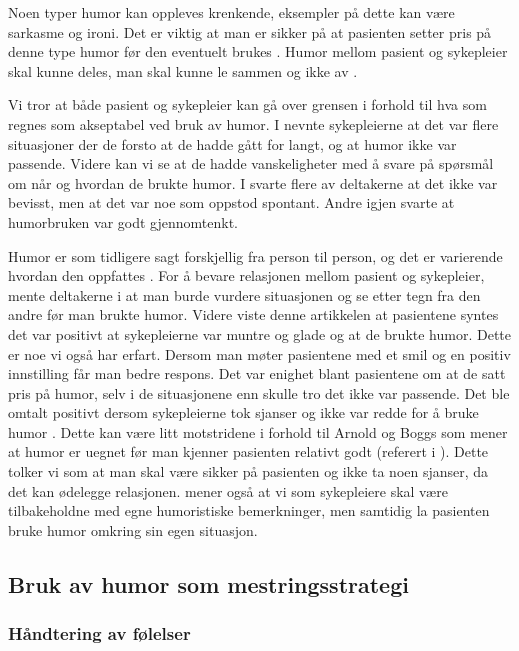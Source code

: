 Noen typer humor kan oppleves krenkende, eksempler på dette kan være sarkasme
og ironi. Det er viktig at man er sikker på at pasienten setter pris på denne
type humor før den eventuelt brukes \cite{eide2008}. Humor mellom pasient og
sykepleier skal kunne deles, man skal kunne le sammen og ikke av
\cite{wist2002}.

Vi tror at både pasient og sykepleier kan gå over grensen i forhold til hva som
regnes som akseptabel ved bruk av humor. I  nevnte sykepleierne
at det var flere situasjoner der de forsto at de hadde gått for langt, og at
humor ikke var passende. Videre kan vi se at de hadde vanskeligheter med å
svare på spørsmål om når og hvordan de brukte humor. I  svarte
flere av deltakerne at det ikke var bevisst, men at det var noe som oppstod
spontant. Andre igjen svarte at humorbruken var godt gjennomtenkt.

Humor er som tidligere sagt forskjellig fra person til person, og det er
varierende hvordan den oppfattes \cite{bjork2011}. For å bevare relasjonen
mellom pasient og sykepleier, mente deltakerne i  at man
burde vurdere situasjonen og se etter tegn fra den andre før man brukte humor.
Videre viste denne artikkelen at pasientene syntes det var positivt at
sykepleierne var muntre og glade og at de brukte humor. Dette er noe vi også
har erfart. Dersom man møter pasientene med et smil og en positiv innstilling
får man bedre respons. Det var enighet blant pasientene om at de satt pris på
humor, selv i de situasjonene enn skulle tro det ikke var passende. Det ble
omtalt positivt dersom sykepleierne tok sjanser og ikke var redde for å bruke
humor \cite{mccreaddie2011}. Dette kan være litt motstridene i forhold til
Arnold og Boggs som mener at humor er uegnet før man kjenner pasienten relativt
godt (referert i ). Dette tolker vi som at man skal være
sikker på pasienten og ikke ta noen sjanser, da det kan ødelegge relasjonen.
 mener også at vi som sykepleiere skal være tilbakeholdne med
egne humoristiske bemerkninger, men samtidig la pasienten bruke humor omkring
sin egen situasjon.

\subsection{Bruk av humor som mestringsstrategi}

\subsubsection{Håndtering av følelser}

